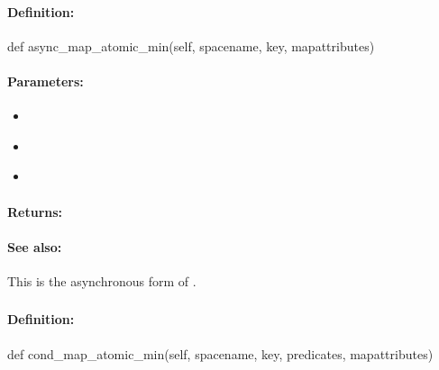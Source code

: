 \paragraph{Definition:}
\begin{pythoncode}
def async_map_atomic_min(self, spacename, key, mapattributes)
\end{pythoncode}

\paragraph{Parameters:}
\begin{itemize}[noitemsep]
\item {}\\

\item {}\\

\item {}\\

\end{itemize}

\paragraph{Returns:}


\paragraph{See also:}  This is the asynchronous form of .

\pagebreak
\subsubsection{}
\label{api:python:cond_map_atomic_min}


\paragraph{Definition:}
\begin{pythoncode}
def cond_map_atomic_min(self, spacename, key, predicates, mapattributes)
\end{pythoncode}

